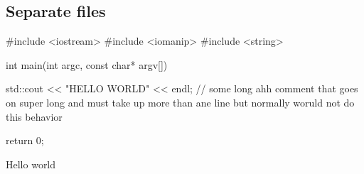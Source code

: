 \documentclass{report}
\begin{document}
    \bigbreak \noindent 
    \subsection{Separate files}


    \bigbreak \noindent 
        \begin{cppcode}
            #include <iostream> 
            #include <iomanip>
            #include <string>

            int main(int argc, const char* argv[]) { 
                    std::cout << "HELLO WORLD" << endl; // some long ahh comment that goes on super long and must take up more than ane line but normally woruld not do this behavior 

                    return 0;
            }
    \end{cppcode}


    \begin{notebox}
        Hello world
    \end{notebox}
    





	

	

	




    
\end{document}
